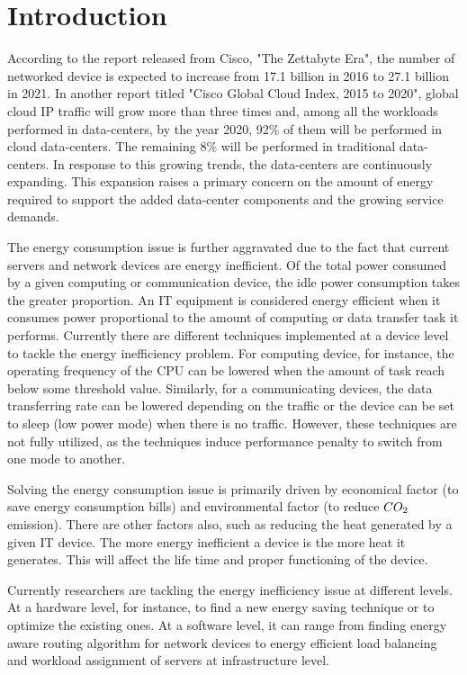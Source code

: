 \chapter{Introduction}
\label{chapter:intro}
According to the report released from Cisco, "The Zettabyte Era", the number of networked device is expected to increase from 17.1 billion in 2016 to 27.1 billion in 2021. In another report titled "Cisco Global Cloud Index, 2015 to 2020", global cloud IP traffic will grow more than three times and, among all the workloads performed in data-centers, by the year 2020, 92\% of them will be performed in cloud data-centers. The remaining 8\% will be performed in traditional data-centers. In response to this growing trends, the data-centers are continuously expanding. This expansion raises a primary concern on the amount of energy required to support the added data-center components and the growing service demands. 

The energy consumption issue is further aggravated due to the fact that current servers and network devices are energy inefficient. Of the total power consumed by a given computing or communication device, the idle power consumption takes the greater proportion. An IT equipment is considered energy efficient when it consumes power proportional to the amount of computing or data transfer task it performs. Currently there are different techniques implemented at a device level to tackle the energy inefficiency problem. For computing device, for instance, the operating frequency of the CPU can be lowered when the amount of task reach below some threshold value. Similarly, for a communicating devices, the data transferring rate can be lowered depending on the traffic or the device can be set to sleep (low power mode) when there is no traffic. However, these techniques are not fully utilized, as the techniques induce performance penalty to switch from one mode to another.  

Solving the energy consumption issue is primarily driven by economical factor (to save energy consumption bills) and environmental factor (to reduce \($$CO_2$$\) emission). There are other factors also, such as reducing the heat generated by a given IT device. The more energy inefficient a device is the more heat it generates. This will affect the life time and proper functioning of the device. 

Currently researchers are tackling the energy inefficiency issue at different levels. At a hardware level, for instance, to find a new  energy saving technique or to optimize the existing ones. At a software level, it can range from finding energy aware routing algorithm for network devices to energy efficient load balancing and workload assignment of servers at infrastructure level. 

